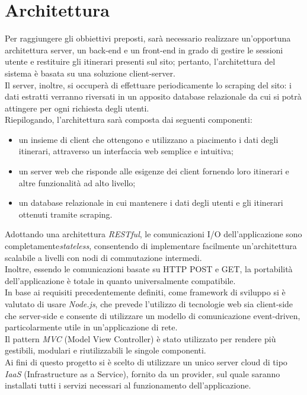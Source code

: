\documentclass[11pt]{report}
\begin{document}
\pagebreak
\section{Architettura}
Per raggiungere gli obbiettivi preposti, sarà necessario realizzare un'opportuna architettura server, un back-end e un front-end in grado di gestire le sessioni utente e restituire gli itinerari presenti sul sito; pertanto, l'architettura del sistema è basata su una soluzione client-server.
\\Il server, inoltre, si occuperà di effettuare periodicamente lo scraping del sito: i dati estratti verranno riversati in un apposito database relazionale da cui si potrà attingere per ogni richiesta degli utenti.
\\Riepilogando, l'architettura sarà composta dai seguenti componenti:
\begin{itemize}
	\item un insieme di client che ottengono e utilizzano a piacimento i dati degli itinerari, attraverso un interfaccia web semplice e intuitiva;
	\item un server web che risponde alle esigenze dei client fornendo loro itinerari e altre funzionalità ad alto livello;
	\item un database relazionale in cui mantenere i dati degli utenti e gli itinerari ottenuti tramite scraping.
\end{itemize}
Adottando una architettura \textit{RESTful}, le comunicazioni I/O dell'applicazione sono completamente\textit{stateless}, consentendo di implementare facilmente un'architettura scalabile a livelli con nodi di commutazione intermedi.
\\Inoltre, essendo le comunicazioni basate su HTTP POST e GET, la portabilità dell'applicazione è totale in quanto universalmente compatibile.
\\In base ai requisiti precedentemente definiti, come framework di sviluppo si è valutato di usare \textit{Node.js}, che prevede l'utilizzo di tecnologie web sia client-side che server-side e consente di utilizzare un modello di comunicazione event-driven, particolarmente utile in un'applicazione di rete.
\\Il pattern \textit{MVC} (Model View Controller) è stato utilizzato per rendere più gestibili, modulari e riutilizzabili le singole componenti.
\\Ai fini di questo progetto si è scelto di utilizzare un unico server cloud di tipo \textit{IaaS} (Infrastructure as a Service), fornito da un provider, sul quale saranno installati tutti i servizi necessari al funzionamento dell'applicazione.
\end{document}
